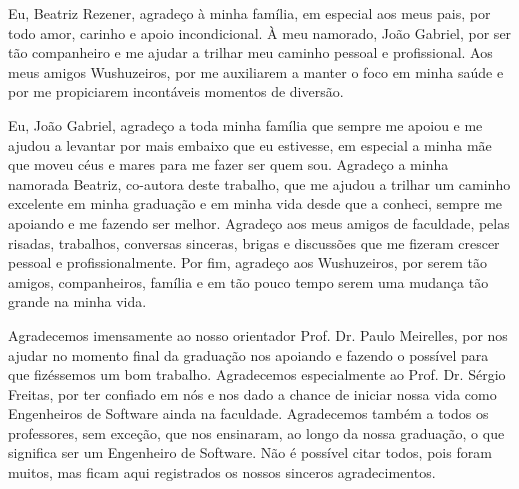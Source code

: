\begin{agradecimentos}

Eu, Beatriz Rezener, agradeço à minha família, em especial aos meus pais, por todo amor, carinho e apoio incondicional. 
À meu namorado, João Gabriel, por ser tão companheiro e me ajudar a trilhar meu caminho pessoal e profissional.
Aos meus amigos Wushuzeiros, por me auxiliarem a manter o foco em minha saúde e por me propiciarem incontáveis momentos de diversão.

Eu, João Gabriel, agradeço a toda minha família que sempre me apoiou e me ajudou a levantar por mais embaixo que eu estivesse, em especial a minha mãe que moveu céus e mares para me fazer ser quem sou.
Agradeço a minha namorada Beatriz, co-autora deste trabalho, que me ajudou a trilhar um caminho excelente em minha graduação e em minha vida desde que a conheci, sempre me apoiando e me fazendo ser melhor.
Agradeço aos meus amigos de faculdade, pelas risadas, trabalhos, conversas sinceras, brigas e discussões que me fizeram crescer pessoal e profissionalmente.
Por fim, agradeço aos Wushuzeiros, por serem tão amigos, companheiros, família e em tão pouco tempo serem uma mudança tão grande na minha vida.

Agradecemos imensamente ao nosso orientador Prof. Dr. Paulo Meirelles, por nos ajudar no momento final da graduação nos apoiando e fazendo o possível para que fizéssemos um bom trabalho.
Agradecemos especialmente ao Prof. Dr. Sérgio Freitas, por ter confiado em nós e nos dado a chance de iniciar nossa vida como Engenheiros de Software ainda na faculdade.
Agradecemos também a todos os professores, sem exceção, que nos ensinaram, ao longo da nossa graduação, o que significa ser um Engenheiro de Software. Não é possível citar todos, 
pois foram muitos, mas ficam aqui registrados os nossos sinceros agradecimentos.

\end{agradecimentos}
